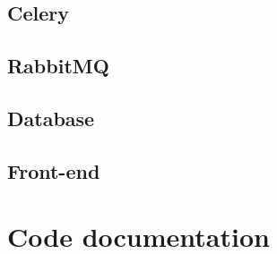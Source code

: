\documentclass[12pt]{article}
\begin{document}
\subsection{Celery}

\subsection{RabbitMQ}

\subsection{Database}

\subsection{Front-end}

\section{Code documentation}



\end{document}
